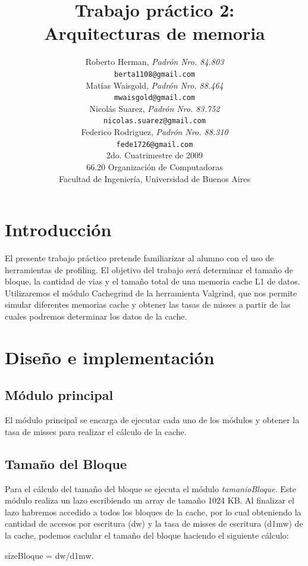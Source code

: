 \documentclass[a4paper,10pt]{article}
\title{\textbf{Trabajo pr\'actico 2:\\ Arquitecturas de memoria}}
\author{Roberto Herman, \textit{Padr\'on Nro. 84.803}\\
            \texttt{ berta1108@gmail.com }\\
            Mat\'ias Waisgold, \textit{Padr\'on Nro. 88.464}\\
            \texttt{ mwaisgold@gmail.com }\\
            Nicol\'as Suarez, \textit{Padr\'on Nro. 83.752}\\
            \texttt{ nicolas.suarez@gmail.com }\\
            Federico Rodriguez, \textit{Padr\'on Nro. 88.310}\\
            \texttt{ fede1726@gmail.com }\\[2.5ex]
            \normalsize{2do. Cuatrimestre de 2009}\\
            \normalsize{66.20 Organizaci\'on de Computadoras}\\
            \normalsize{Facultad de Ingenier\'ia, Universidad de Buenos Aires}\\
       }
\date{}
\begin{document}
\maketitle

\thispagestyle{empty}

\newpage

\section{Introducci\'on}

El presente trabajo pr\'actico pretende familiarizar al alumno con el uso de herramientas de profiling.
El objetivo del trabajo ser\'a determinar el tama\~no de bloque, la cantidad de vias y el tama\~no total
de una memoria cache L1 de datos.\\
Utilizaremos el m\'odulo Cachegrind de la herramienta Valgrind\cite{Valgrind}, que nos permite simular diferentes memorias
cache y obtener las tasas de misses a partir de las cuales podremos determinar los datos de la cache.

\section{Dise\~no e implementaci\'on}

\subsection{M\'odulo principal}
El m\'odulo principal se encarga de ejecutar cada uno de los m\'odulos y obtener la tasa de misses para realizar
el c\'alculo de la cache.

\subsection{Tama\~no del Bloque}
Para el c\'alculo del tama\~no del bloque se ejecuta el m\'odulo \textit{tamanioBloque}. Este m\'odulo realiza un lazo
escribiendo un array de tama\~no 1024 KB. Al finalizar el lazo habremos accedido a todos los bloques de la cache, por lo cual obteniendo la cantidad de accesos por escritura (dw) y la tasa de misses de escritura (d1mw) de la cache, podemos caclular el tama\~no del bloque haciendo el siguiente c\'alculo:
\begin{center}
sizeBloque = dw/d1mw.
\end{center}
\end{document}
